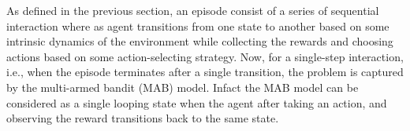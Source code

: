 As defined in the previous section, an episode consist of a series of sequential interaction where as agent transitions from one state to another based on some intrinsic dynamics of the environment while collecting the rewards and choosing actions based on some action-selecting strategy. Now, for a single-step interaction, i.e., when the episode terminates after a single transition, the problem is captured by the multi-armed bandit (MAB) model. Infact the MAB model can be considered as a single looping state when the agent after taking an action, and observing the reward transitions back to the same state. 
